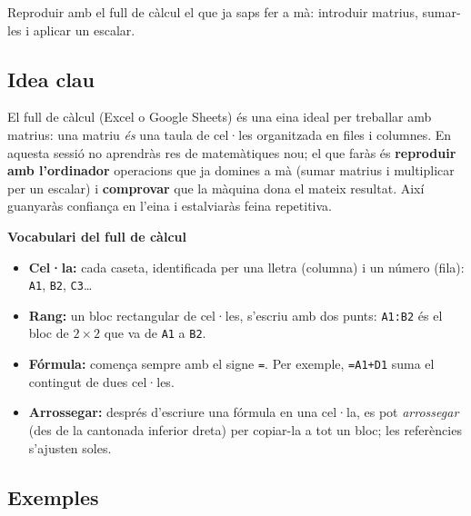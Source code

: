 %
{Reproduir amb el full de càlcul el que ja saps fer a mà: introduir matrius, sumar-les i aplicar un escalar.}

\subsection{Idea clau}

El full de càlcul (Excel o Google Sheets) és una eina ideal per treballar amb
matrius: una matriu \emph{és} una taula de cel·les organitzada en files i
columnes. En aquesta sessió no aprendràs res de matemàtiques nou; el que faràs és
\textbf{reproduir amb l'ordinador} operacions que ja domines a mà (sumar matrius
i multiplicar per un escalar) i \textbf{comprovar} que la màquina dona el mateix
resultat. Així guanyaràs confiança en l'eina i estalviaràs feina repetitiva.

\begin{idea}
\textbf{Vocabulari del full de càlcul}
\begin{itemize}[leftmargin=1.4em, itemsep=2pt]
  \item \textbf{Cel·la:} cada caseta, identificada per una lletra (columna) i un
        número (fila): \texttt{A1}, \texttt{B2}, \texttt{C3}\dots
  \item \textbf{Rang:} un bloc rectangular de cel·les, s'escriu amb dos punts:
        \texttt{A1:B2} és el bloc de $2\times 2$ que va de \texttt{A1} a \texttt{B2}.
  \item \textbf{Fórmula:} comença sempre amb el signe \texttt{=}. Per exemple,
        \texttt{=A1+D1} suma el contingut de dues cel·les.
  \item \textbf{Arrossegar:} després d'escriure una fórmula en una cel·la, es pot
        \emph{arrossegar} (des de la cantonada inferior dreta) per copiar-la a tot
        un bloc; les referències s'ajusten soles.
\end{itemize}
\end{idea}

\subsection{Exemples}

